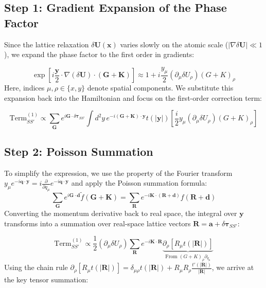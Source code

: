 \documentclass[10pt, oneside]{article}
\begin{document}
\subsection{Step 1: Gradient Expansion of the Phase Factor}
Since the lattice relaxation $\delta \boldsymbol{U}(\boldsymbol{x})$ varies slowly on the atomic scale ($|\nabla \delta \boldsymbol{U}| \ll 1$), we expand the phase factor to the first order in gradients:

\begin{equation}
\exp\left[ i \frac{\boldsymbol{y}}{2} \cdot \nabla (\delta \boldsymbol{U}) \cdot (\boldsymbol{G}+\boldsymbol{K}) \right] \approx 1 + i \frac{y_\mu}{2} (\partial_\mu \delta U_\rho) (G+K)_\rho
\end{equation}
Here, indices $\mu, \rho \in \{x, y\}$ denote spatial components. We substitute this expansion back into the Hamiltonian and focus on the first-order correction term:

\begin{equation}
\text{Term}^{(1)}_{SS'} \propto \sum_{\boldsymbol{G}} e^{i\boldsymbol{G} \cdot \delta\boldsymbol{\tau}_{SS'}} \int d^2y \, e^{-i(\boldsymbol{G}+\boldsymbol{K})\cdot \boldsymbol{y}} t(|\boldsymbol{y}|) \left[ \frac{i}{2} y_\mu (\partial_\mu \delta U_\rho) (G+K)_\rho \right]
\end{equation}

\subsection{Step 2: Poisson Summation}
To simplify the expression, we use the property of the Fourier transform $y_\mu e^{-i\boldsymbol{q}\cdot\boldsymbol{y}} = i \frac{\partial}{\partial q_\mu} e^{-i\boldsymbol{q}\cdot\boldsymbol{y}}$ and apply the Poisson summation formula:
\begin{equation}
\sum_{\boldsymbol{G}} e^{i\boldsymbol{G}\cdot\boldsymbol{d}} \tilde{f}(\boldsymbol{G}+\boldsymbol{K}) = \sum_{\boldsymbol{R}} e^{-i\boldsymbol{K}\cdot(\boldsymbol{R}+\boldsymbol{d})} f(\boldsymbol{R}+\boldsymbol{d})
\end{equation}
Converting the momentum derivative back to real space, the integral over $\boldsymbol{y}$ transforms into a summation over real-space lattice vectors $\boldsymbol{R} = \boldsymbol{a} + \delta\boldsymbol{\tau}_{SS'}$:

\begin{equation}
\text{Term}^{(1)}_{SS'} \propto \frac{1}{2} (\partial_\mu \delta U_\rho) \sum_{\boldsymbol{R}} e^{-i\boldsymbol{K} \cdot \boldsymbol{R}} \underbrace{\partial_\rho \left[ R_\mu t(|\boldsymbol{R}|) \right]}_{\text{From } (G+K)_\rho \partial_{q_\mu}}
\end{equation}
Using the chain rule $\partial_\rho [R_\mu t(|\boldsymbol{R}|)] = \delta_{\mu\rho} t(|\boldsymbol{R}|) + R_\mu R_\rho \frac{t'(|\boldsymbol{R}|)}{|\boldsymbol{R}|}$, we arrive at the key tensor summation:
\end{document}
